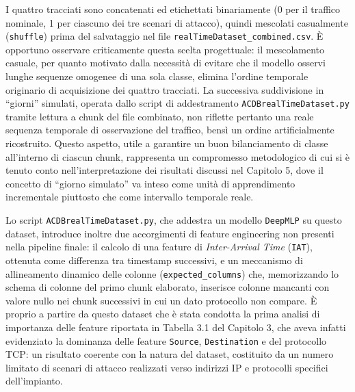 \documentclass[12pt,a4paper]{report}
\begin{document}
I quattro tracciati sono concatenati ed etichettati binariamente (0 per il traffico nominale, 1 per ciascuno dei tre scenari di attacco), quindi mescolati casualmente (\texttt{shuffle}) prima del salvataggio nel file \texttt{realTimeDataset\_combined.csv}. È opportuno osservare criticamente questa scelta progettuale: il mescolamento casuale, per quanto motivato dalla necessità di evitare che il modello osservi lunghe sequenze omogenee di una sola classe, elimina l'ordine temporale originario di acquisizione dei quattro tracciati. La successiva suddivisione in ``giorni'' simulati, operata dallo script di addestramento \texttt{ACDBrealTimeDataset.py} tramite lettura a chunk del file combinato, non riflette pertanto una reale sequenza temporale di osservazione del traffico, bensì un ordine artificialmente ricostruito. Questo aspetto, utile a garantire un buon bilanciamento di classe all'interno di ciascun chunk, rappresenta un compromesso metodologico di cui si è tenuto conto nell'interpretazione dei risultati discussi nel Capitolo 5, dove il concetto di ``giorno simulato'' va inteso come unità di apprendimento incrementale piuttosto che come intervallo temporale reale.

Lo script \texttt{ACDBrealTimeDataset.py}, che addestra un modello \texttt{DeepMLP} su questo dataset, introduce inoltre due accorgimenti di feature engineering non presenti nella pipeline finale: il calcolo di una feature di \emph{Inter-Arrival Time} (\texttt{IAT}), ottenuta come differenza tra timestamp successivi, e un meccanismo di allineamento dinamico delle colonne (\texttt{expected\_columns}) che, memorizzando lo schema di colonne del primo chunk elaborato, inserisce colonne mancanti con valore nullo nei chunk successivi in cui un dato protocollo non compare. È proprio a partire da questo dataset che è stata condotta la prima analisi di importanza delle feature riportata in Tabella 3.1 del Capitolo 3, che aveva infatti evidenziato la dominanza delle feature \texttt{Source}, \texttt{Destination} e del protocollo TCP: un risultato coerente con la natura del dataset, costituito da un numero limitato di scenari di attacco realizzati verso indirizzi IP e protocolli specifici dell'impianto.
\end{document}
